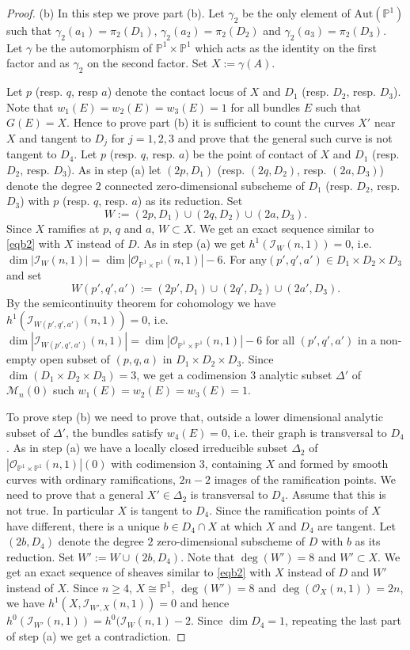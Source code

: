 \documentclass[
  a4paper, 
  reqno, 
  oneside, 
  11pt
]{amsart}
\theoremstyle{plain}	%
\theoremstyle{mydef} %
\theoremstyle{remark}
\theoremstyle{definition}
\theoremstyle{remark}
\begin{document}
\begin{proof}
 (b) In this step we prove part (b). Let $\gamma_2$ be the only element of  $\mathrm{Aut}(\mathbb P^1)$ such that $\gamma_2(a_1)=\pi_2(D_1)$, $\gamma_2(a_2)= \pi_2(D_2)$ and $\gamma_2(a_3)=\pi_2(D_3)$. Let $\gamma$ be the automorphism of $\mathbb P^1\times \mathbb P^1$ which acts as the identity on the first factor and as $\gamma_2$ on the second factor. Set $X:= \gamma(A)$. 
 
 Let $p$ (resp. $q$, resp $a$) denote the contact locus of $X$ and $D_1$ (resp. $D_2$, resp. $D_3$). Note that $w_1(E)=w_2(E)=w_3(E)=1$ for all bundles $E$ such that $G(E)=X$. Hence to prove part (b) it is sufficient to count the curves $X'$ near $X$ and tangent to $D_j$ for $j=1,2,3$ and prove that the general such curve is not tangent to $D_4$. Let $p$ (resp. $q$, resp. $a$) be the point of contact of $X$ and $D_1$ (resp. $D_2$, resp. $D_3$). As in step (a) let $(2p,D_1)$ (resp. $(2q,D_2)$, resp. $(2a,D_3)$) denote the degree $2$ connected zero-dimensional subscheme of $D_1$ (resp. $D_2$, resp. $D_3$) with $p$ (resp. $q$, resp. $a$) as its reduction. Set 
 $$W:= (2p,D_1)\cup (2q,D_2)\cup(2a,D_3).$$ 
 Since $X$ ramifies at $p$, $q$ and $a$, $W\subset X$. We get an exact sequence similar to \eqref{eqb2} with $X$ instead of $D$.
As in step (a) we get $h^1(\mathcal I_W(n,1)) =0$, i.e. $\dim |\mathcal I_W(n,1)| =\dim |\mathcal O_{\mathbb P^1\times \mathbb P^1}(n,1)|-6$. For any$(p',q',a')\in D_1\times D_2\times D_3$ and set 
$$W(p',q',a'):= (2p',D_1)\cup (2q',D_2)\cup(2a',D_3).$$ By the semicontinuity theorem for cohomology  \cite[Th. III.13.8]{h} we have  $h^1(\mathcal I_{W(p',q',a')}(n,1)) =0$, i.e. $\dim |\mathcal I_{W(p',q',a')}(n,1)| =\dim |\mathcal O_{\mathbb P^1\times \mathbb P^1}(n,1)|-6$ for all $(p',q',a')$ in a non-empty open subset of $(p,q,a)$ in  $D_1\times D_2\times D_3$. Since $\dim (D_1\times D_2\times D_3)=3$, we get
a codimension $3$ analytic subset $\Delta'$ of $\mathcal M_n(0)$ such $w_1(E)=w_2(E)=w_3(E)=1$. 

To prove step (b) we need to prove that, outside a lower dimensional analytic subset of $\Delta'$, the bundles satisfy $w_4(E)=0$, i.e. their graph is transversal to $D_4$. As in step (a) we have a locally closed irreducible subset $\Delta_2$ of $|\mathcal O_{\mathbb P^1\times \mathbb P^1}(n,1)|(0)$ with codimension $3$, containing $X$ and formed by smooth curves with ordinary ramifications, $2n-2$ images of the ramification points. We need to prove that a general $X'\in \Delta_2$ is transversal to $D_4$. Assume that this is not true. In particular $X$ is tangent to $D_4$. Since the ramification points of $X$ have different, there is a unique $b\in D_4\cap X$ at which $X$ and $D_4$ are tangent.
Let $(2b,D_4)$ denote the degree $2$ zero-dimensional subscheme of $D$ with $b$ as its reduction. Set $W':= W\cup (2b,D_4)$.
Note that $\deg(W')=8$ and $W'\subset X$. We get an exact sequence of sheaves similar to \eqref{eqb2} with $X$ instead of $D$ and $W'$ instead of $X$.
Since $n\ge 4$, $X\cong \mathbb P^1$, $\deg(W')=8$ and $\deg(\mathcal O_X(n,1)) =2n$, we have $h^1(X,\mathcal I_{W',X}(n,1)) =0$ and hence
$h^0(\mathcal I_{W'}(n,1)) =h^0(\mathcal I_W(n,1)-2$. Since $\dim D_4 =1$, repeating the last part of step (a) we get a contradiction.
\end{proof}
\end{document}
